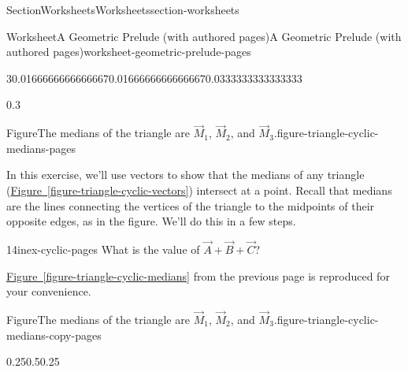 \documentclass[twoside,10pt,]{article}
\newcommand{\xreffont}{\relax}
\numberwithin{equation}{section}
\begin{document}
\begin{sectionptx}{Section}{Worksheets}{}{Worksheets}{}{}{section-worksheets}
\begin{worksheet-subsection}{Worksheet}{A Geometric Prelude (with authored pages)}{}{A Geometric Prelude (with authored pages)}{}{}{worksheet-geometric-prelude-pages}
\begin{introduction}{}
\begin{sidebyside}{3}{0.0166666666666667}{0.0166666666666667}{0.0333333333333333}
\begin{sbspanel}{0.3}
\begin{panelfigureptx}{Figure}{The medians of the triangle are \(\vec{M}_1\), \(\vec{M}_2\), and \(\vec{M}_3\).}{figure-triangle-cyclic-medians-pages}{}
{\begin{tikzpicture}[xscale=1.5, yscale=1.5]
\end{tikzpicture}%
}%
\tcblower
\end{panelfigureptx}%
\end{sbspanel}%
\end{sidebyside}%
\par
In this exercise, we'll use vectors to show that the medians of any triangle (\hyperref[figure-triangle-cyclic-vectors]{Figure~{\xreffont\ref{figure-triangle-cyclic-vectors}}}) intersect at a point. Recall that medians are the lines connecting the vertices of the triangle to the midpoints of their opposite edges, as in the figure. We'll do this in a few steps.%
\end{introduction}%
\begin{divisionexercise}{1}{}{4in}{ex-cyclic-pages}%
What is the value of \(\vec{A} + \vec{B} + \vec{C}\)?%
\end{divisionexercise}%
\clearpage
\hyperref[figure-triangle-cyclic-medians]{Figure~{\xreffont\ref{figure-triangle-cyclic-medians}}} from the previous page is reproduced for your convenience.%
\begin{figureptx}{Figure}{The medians of the triangle are \(\vec{M}_1\), \(\vec{M}_2\), and \(\vec{M}_3\).}{figure-triangle-cyclic-medians-copy-pages}{}%
\begin{image}{0.25}{0.5}{0.25}{}%
%
\end{image}%
\tcblower
\end{figureptx}%

\end{worksheet-subsection}
\end{sectionptx}
\end{document}
